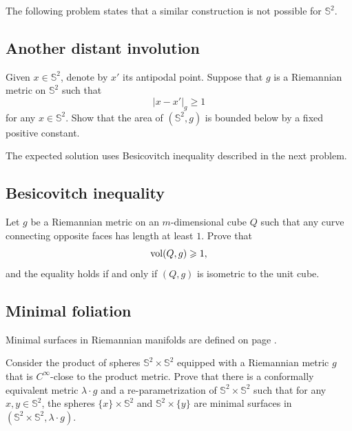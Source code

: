 The following problem states that a similar construction is not possible for $\mathbb{S}^2$. 


\subsection*{Another distant involution}
\label{Another distant involution}

\begin{pr}
Given $x\in \mathbb{S}^2$, denote by $x'$ its antipodal point.
Suppose that $g$ is a Riemannian metric on $\mathbb{S}^2$ such that
\[|x-x'|_g\ge1\]
for any $x\in\mathbb{S}^2$.
Show that the area of $(\mathbb{S}^2,g)$ is bounded below by a fixed positive constant. 
\end{pr}

The expected solution uses Besicovitch inequality described in the next problem.


\subsection*{Besicovitch inequality}
\label{Besicovitch inequality}

\begin{pr}
Let $g$ be a Riemannian metric on an $m$-dimensional cube $Q$ such that any curve connecting opposite faces has length at least $1$. 
Prove that 
\[\operatorname{\rm vol}\nolimits(Q,g)\geqslant 1,\] 
and the equality holds if and only if $(Q,g)$ is isometric to the unit cube.
\end{pr}



\subsection*{Minimal foliation\thm}
\label{gromomorphic-curves}

Minimal surfaces in Riemannian manifolds are defined on page \pageref{minimal surface}.

\begin{pr}
Consider the product of spheres $\mathbb{S}^2\times \mathbb{S}^2$ equipped with a Riemannian metric $g$ that is $C^\infty$-close to the product metric. 
Prove that there is a conformally equivalent metric $\lambda\cdot g$ and a re-parametrization of $\mathbb{S}^2\times \mathbb{S}^2$
such that for any $x,y\in \mathbb{S}^2$, the spheres $\{x\}\times\mathbb{S}^2$ and $\mathbb{S}^2\times \{y\}$ are minimal surfaces 
in $(\mathbb{S}^2\times \mathbb{S}^2,\lambda\cdot g)$.
\end{pr}


